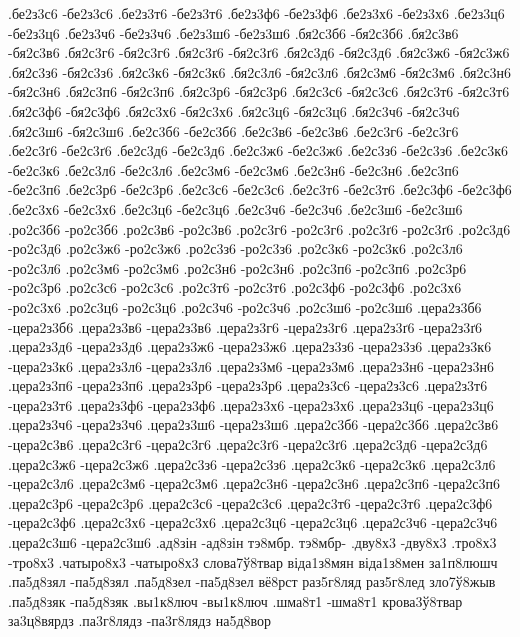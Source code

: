 {.бе2з3с6 -бе2з3с6
.бе2з3т6 -бе2з3т6
.бе2з3ф6 -бе2з3ф6
.бе2з3х6 -бе2з3х6
.бе2з3ц6 -бе2з3ц6
.бе2з3ч6 -бе2з3ч6
.бе2з3ш6 -бе2з3ш6
.бя2с3б6 -бя2с3б6
.бя2с3в6 -бя2с3в6
.бя2с3г6 -бя2с3г6
.бя2с3ґ6 -бя2с3ґ6
.бя2с3д6 -бя2с3д6
.бя2с3ж6 -бя2с3ж6
.бя2с3з6 -бя2с3з6
.бя2с3к6 -бя2с3к6
.бя2с3л6 -бя2с3л6
.бя2с3м6 -бя2с3м6
.бя2с3н6 -бя2с3н6
.бя2с3п6 -бя2с3п6
.бя2с3р6 -бя2с3р6
.бя2с3с6 -бя2с3с6
.бя2с3т6 -бя2с3т6
.бя2с3ф6 -бя2с3ф6
.бя2с3х6 -бя2с3х6
.бя2с3ц6 -бя2с3ц6
.бя2с3ч6 -бя2с3ч6
.бя2с3ш6 -бя2с3ш6
.бе2с3б6 -бе2с3б6
.бе2с3в6 -бе2с3в6
.бе2с3г6 -бе2с3г6
.бе2с3ґ6 -бе2с3ґ6
.бе2с3д6 -бе2с3д6
.бе2с3ж6 -бе2с3ж6
.бе2с3з6 -бе2с3з6
.бе2с3к6 -бе2с3к6
.бе2с3л6 -бе2с3л6
.бе2с3м6 -бе2с3м6
.бе2с3н6 -бе2с3н6
.бе2с3п6 -бе2с3п6
.бе2с3р6 -бе2с3р6
.бе2с3с6 -бе2с3с6
.бе2с3т6 -бе2с3т6
.бе2с3ф6 -бе2с3ф6
.бе2с3х6 -бе2с3х6
.бе2с3ц6 -бе2с3ц6
.бе2с3ч6 -бе2с3ч6
.бе2с3ш6 -бе2с3ш6
.ро2с3б6 -ро2с3б6
.ро2с3в6 -ро2с3в6
.ро2с3г6 -ро2с3г6
.ро2с3ґ6 -ро2с3ґ6
.ро2с3д6 -ро2с3д6
.ро2с3ж6 -ро2с3ж6
.ро2с3з6 -ро2с3з6
.ро2с3к6 -ро2с3к6
.ро2с3л6 -ро2с3л6
.ро2с3м6 -ро2с3м6
.ро2с3н6 -ро2с3н6
.ро2с3п6 -ро2с3п6
.ро2с3р6 -ро2с3р6
.ро2с3с6 -ро2с3с6
.ро2с3т6 -ро2с3т6
.ро2с3ф6 -ро2с3ф6
.ро2с3х6 -ро2с3х6
.ро2с3ц6 -ро2с3ц6
.ро2с3ч6 -ро2с3ч6
.ро2с3ш6 -ро2с3ш6
.цера2з3б6 -цера2з3б6
.цера2з3в6 -цера2з3в6
.цера2з3г6 -цера2з3г6
.цера2з3ґ6 -цера2з3ґ6
.цера2з3д6 -цера2з3д6
.цера2з3ж6 -цера2з3ж6
.цера2з3з6 -цера2з3з6
.цера2з3к6 -цера2з3к6
.цера2з3л6 -цера2з3л6
.цера2з3м6 -цера2з3м6
.цера2з3н6 -цера2з3н6
.цера2з3п6 -цера2з3п6
.цера2з3р6 -цера2з3р6
.цера2з3с6 -цера2з3с6
.цера2з3т6 -цера2з3т6
.цера2з3ф6 -цера2з3ф6
.цера2з3х6 -цера2з3х6
.цера2з3ц6 -цера2з3ц6
.цера2з3ч6 -цера2з3ч6
.цера2з3ш6 -цера2з3ш6
.цера2с3б6 -цера2с3б6
.цера2с3в6 -цера2с3в6
.цера2с3г6 -цера2с3г6
.цера2с3ґ6 -цера2с3ґ6
.цера2с3д6 -цера2с3д6
.цера2с3ж6 -цера2с3ж6
.цера2с3з6 -цера2с3з6
.цера2с3к6 -цера2с3к6
.цера2с3л6 -цера2с3л6
.цера2с3м6 -цера2с3м6
.цера2с3н6 -цера2с3н6
.цера2с3п6 -цера2с3п6
.цера2с3р6 -цера2с3р6
.цера2с3с6 -цера2с3с6
.цера2с3т6 -цера2с3т6
.цера2с3ф6 -цера2с3ф6
.цера2с3х6 -цера2с3х6
.цера2с3ц6 -цера2с3ц6
.цера2с3ч6 -цера2с3ч6
.цера2с3ш6 -цера2с3ш6
%
%
%
.ад8зін -ад8зін
тэ8мбр. тэ8мбр-
.дву8х3 -дву8х3
.тро8х3 -тро8х3
.чатыро8х3 -чатыро8х3
слова7ў8твар
віда1з8мян
віда1з8мен
за1п8люшч
.па5д8зял -па5д8зял
.па5д8зел -па5д8зел
вё8рст
раз5г8ляд
раз5г8лед
зло7ў8жыв
.па5д8зяк -па5д8зяк
.вы1к8люч -вы1к8люч
.шма8т1 -шма8т1
крова3ў8твар
за3ц8вярдз
.па3г8лядз -па3г8лядз
на5д8вор
}

